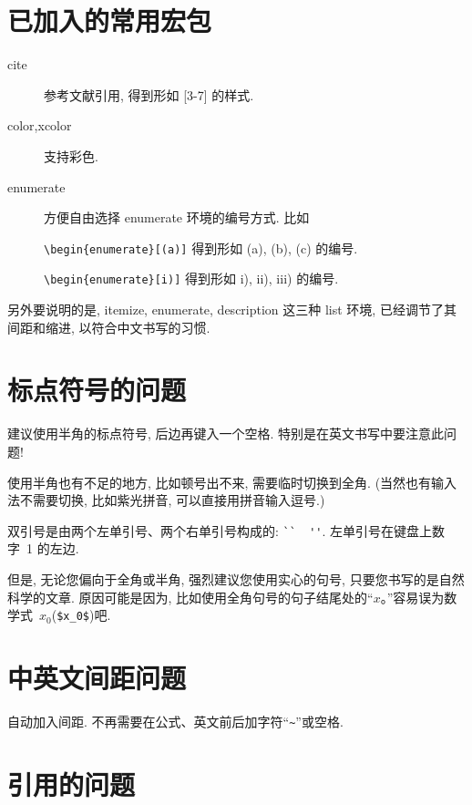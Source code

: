 \documentclass{WHUMaster}   %
\begin{document}
\section{已加入的常用宏包}

\begin{description}
	\item[cite]  参考文献引用, 得到形如 [3-7] 的样式.
	\item[color,xcolor]  支持彩色.
	\item[enumerate]  方便自由选择 enumerate 环境的编号方式. 比如

	\verb|\begin{enumerate}[(a)]| 得到形如 (a), (b), (c) 的编号.

	\verb|\begin{enumerate}[i)]| 得到形如 i), ii), iii) 的编号.

\end{description}

另外要说明的是,  itemize, enumerate, description 这三种 list 环境, 已经调节了其间距和缩进,
以符合中文书写的习惯.

\section{标点符号的问题}

建议使用半角的标点符号, 后边再键入一个空格. 特别是在英文书写中要注意此问题!

使用半角也有不足的地方, 比如顿号出不来, 需要临时切换到全角. (当然也有输入法不需要切换, 比如紫光拼音, 可以直接用拼音输入逗号.)

双引号是由两个左单引号、两个右单引号构成的: \verb|``  ''|. 左单引号在键盘上数字~1 的左边.

但是, 无论您偏向于全角或半角, 强烈建议您使用实心的句号, 只要您书写的是自然科学的文章.
原因可能是因为, 比如使用全角句号的句子结尾处的``$x$。''容易误为数学式~$x_0$(\verb|$x_0$|)吧.

\section{中英文间距问题}

自动加入间距. 不再需要在公式、英文前后加字符``\verb|~|''或空格.

\section{引用的问题}
\end{document}

